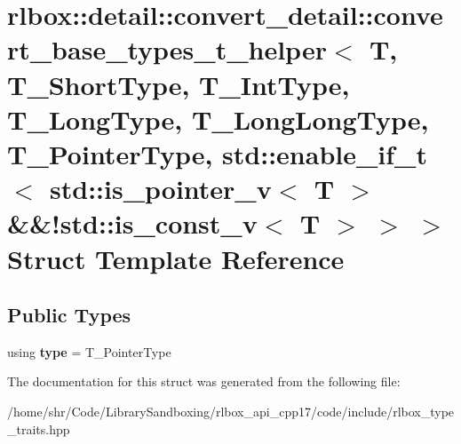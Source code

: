 \hypertarget{structrlbox_1_1detail_1_1convert__detail_1_1convert__base__types__t__helper_3_01T_00_01T__ShortT47d1caaebe2e5bd6a334ab7184ad13c2}{}\section{rlbox\+:\+:detail\+:\+:convert\+\_\+detail\+:\+:convert\+\_\+base\+\_\+types\+\_\+t\+\_\+helper$<$ T, T\+\_\+\+Short\+Type, T\+\_\+\+Int\+Type, T\+\_\+\+Long\+Type, T\+\_\+\+Long\+Long\+Type, T\+\_\+\+Pointer\+Type, std\+:\+:enable\+\_\+if\+\_\+t$<$ std\+:\+:is\+\_\+pointer\+\_\+v$<$ T $>$ \&\&!std\+:\+:is\+\_\+const\+\_\+v$<$ T $>$ $>$ $>$ Struct Template Reference}
\label{structrlbox_1_1detail_1_1convert__detail_1_1convert__base__types__t__helper_3_01T_00_01T__ShortT47d1caaebe2e5bd6a334ab7184ad13c2}
\subsection*{Public Types}
\begin{DoxyCompactItemize}
\item 
\mbox{\label{structrlbox_1_1detail_1_1convert__detail_1_1convert__base__types__t__helper_3_01T_00_01T__ShortT47d1caaebe2e5bd6a334ab7184ad13c2_a1b6604639291d981ec73c1fb959e60ea}} 
using {\bfseries type} = T\+\_\+\+Pointer\+Type
\end{DoxyCompactItemize}


The documentation for this struct was generated from the following file\+:\begin{DoxyCompactItemize}
\item 
/home/shr/\+Code/\+Library\+Sandboxing/rlbox\+\_\+api\+\_\+cpp17/code/include/rlbox\+\_\+type\+\_\+traits.\+hpp\end{DoxyCompactItemize}
